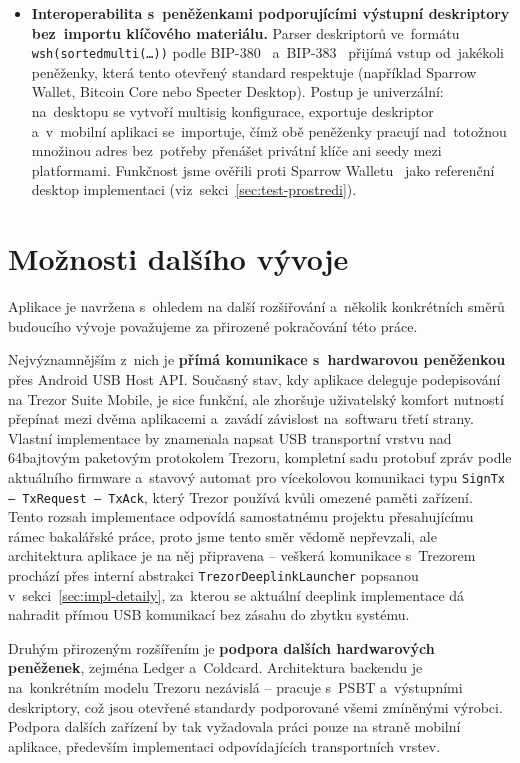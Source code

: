 \begin{itemize}
\item \textbf{Interoperabilita s~peněženkami podporujícími výstupní
  deskriptory bez~importu klíčového materiálu.} Parser deskriptorů
  ve~formátu \texttt{wsh(sortedmulti(\ldots))} podle BIP-380~\cite{BIP380}
  a~BIP-383~\cite{BIP383} přijímá vstup od~jakékoli peněženky, která
  tento otevřený standard respektuje (například Sparrow Wallet, Bitcoin
  Core nebo Specter Desktop). Postup je univerzální: na~desktopu se
  vytvoří multisig konfigurace, exportuje deskriptor a~v~mobilní
  aplikaci se~importuje, čímž obě peněženky pracují nad~totožnou
  množinou adres bez~potřeby přenášet privátní klíče ani seedy mezi
  platformami. Funkčnost jsme ověřili proti Sparrow
  Walletu~\cite{SparrowWallet} jako referenční desktop implementaci
  (viz~sekci~\ref{sec:test-prostredi}).
\end{itemize}

\section*{Možnosti dalšího vývoje}

Aplikace je navržena s~ohledem na další rozšiřování a~několik konkrétních
směrů budoucího vývoje považujeme za přirozené pokračování této práce.

Nejvýznamnějším z~nich je \textbf{přímá komunikace s~hardwarovou peněženkou}
přes Android USB Host API. Současný stav, kdy aplikace deleguje podepisování
na Trezor Suite Mobile, je sice funkční, ale zhoršuje uživatelský komfort
nutností přepínat mezi dvěma aplikacemi a~zavádí závislost na~softwaru třetí
strany. Vlastní implementace by znamenala napsat USB transportní vrstvu
nad 64bajtovým paketovým protokolem Trezoru, kompletní sadu protobuf zpráv
podle aktuálního firmware a~stavový automat pro vícekolovou komunikaci typu
\texttt{SignTx -- TxRequest -- TxAck}, který Trezor používá kvůli omezené
paměti zařízení. Tento rozsah implementace odpovídá samostatnému projektu
přesahujícímu rámec bakalářské práce, proto jsme tento směr vědomě nepřevzali,
ale architektura aplikace
je na něj připravena -- veškerá komunikace s~Trezorem prochází přes interní
abstrakci \texttt{TrezorDeeplinkLauncher} popsanou v~sekci~\ref{sec:impl-detaily},
za~kterou se aktuální deeplink implementace dá nahradit přímou USB
komunikací bez zásahu do zbytku systému.

Druhým přirozeným rozšířením je \textbf{podpora dalších hardwarových peněženek},
zejména Ledger a~Coldcard. Architektura backendu je na~konkrétním modelu
Trezoru nezávislá -- pracuje s~PSBT a~výstupními deskriptory, což jsou
otevřené standardy podporované všemi zmíněnými výrobci. Podpora dalších
zařízení by tak vyžadovala práci pouze na straně mobilní aplikace,
především implementaci odpovídajících transportních vrstev.

